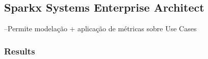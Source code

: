 \subsection{Sparkx Systems Enterprise Architect}
--Permite modelação + aplicação de métricas sobre Use Cases
\subsubsection{Results}
